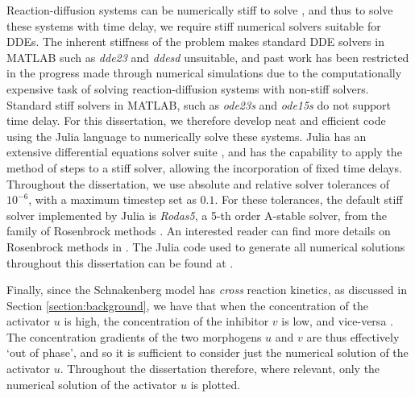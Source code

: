 Reaction-diffusion systems can be numerically stiff to solve \cite{stiff1, william}, and thus to solve these systems with time delay, we require stiff numerical solvers suitable for DDEs. The inherent stiffness of the problem makes standard DDE solvers in MATLAB such as \emph{dde23} and \emph{ddesd} unsuitable, and past work has been restricted in the progress made through numerical simulations \cite{william} due to the computationally expensive task of solving reaction-diffusion systems with non-stiff solvers. Standard stiff solvers in MATLAB, such as \emph{ode23s} and \emph{ode15s} do not support time delay. For this dissertation, we therefore develop neat and efficient code using the Julia language to numerically solve these systems. Julia has an extensive differential equations solver suite \cite{rodas}, and has the capability to apply the method of steps \cite{methsteps} to a stiff solver, allowing the incorporation of fixed time delays. Throughout the dissertation, we use absolute and relative solver tolerances of $10^{-6}$, with a maximum timestep set as $0.1$. For these tolerances, the default stiff solver implemented by Julia is \emph{Rodas5}, a 5-th order A-stable solver, from the family of Rosenbrock methods \cite{rodas}. An interested reader can find more details on Rosenbrock methods in \cite{rosenbrock}. The Julia code used to generate all numerical solutions throughout this dissertation can be found at \cite{git}.

Finally, since the Schnakenberg model has \textit{cross} reaction kinetics, as discussed in Section \ref{section:background}, we have that when the concentration of the activator $u$ is high, the concentration of the inhibitor $v$ is low, and vice-versa \cite{murray}. The concentration gradients of the two morphogens $u$ and $v$ are thus effectively `out of phase', and so it is sufficient to consider just the numerical solution of the activator $u$. Throughout the dissertation therefore, where relevant, only the numerical solution of the activator $u$ is plotted.
